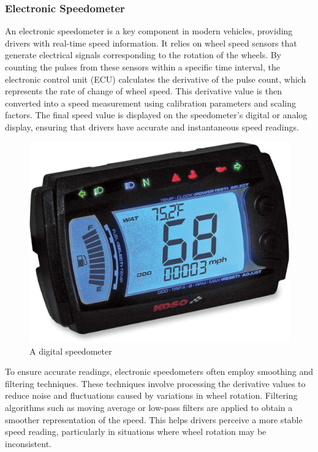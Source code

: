 \documentclass[13pt,a4paper]{report}
\begin{document}

\subsubsection{Electronic Speedometer}

An electronic speedometer is a key component in modern vehicles, providing drivers with real-time speed information. It relies on wheel speed sensors that generate electrical signals corresponding to the rotation of the wheels. By counting the pulses from these sensors within a specific time interval, the electronic control unit (ECU) calculates the derivative of the pulse count, which represents the rate of change of wheel speed. This derivative value is then converted into a speed measurement using calibration parameters and scaling factors. The final speed value is displayed on the speedometer's digital or analog display, ensuring that drivers have accurate and instantaneous speed readings.\\[0.1cm]

\begin{center}
\begin{figure}[H]
\centering
\includegraphics[width=.45\textwidth]{images/electronic_speedometer.jpg}
\caption{A digital speedometer}
\end{figure}
\end{center}

\vspace{-0.8cm}

To ensure accurate readings, electronic speedometers often employ smoothing and filtering techniques. These techniques involve processing the derivative values to reduce noise and fluctuations caused by variations in wheel rotation. Filtering algorithms such as moving average or low-pass filters are applied to obtain a smoother representation of the speed. This helps drivers perceive a more stable speed reading, particularly in situations where wheel rotation may be inconsistent.
\end{document}
